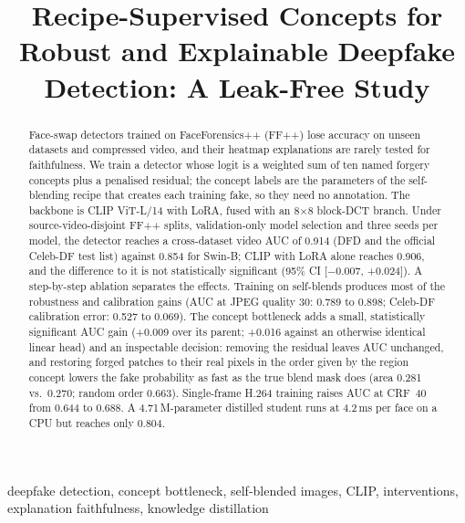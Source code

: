 \documentclass[conference]{IEEEtran}
\begin{document}
\title{Recipe-Supervised Concepts for Robust and Explainable Deepfake Detection: A Leak-Free Study}

\author{
}

\maketitle

\begin{abstract}
Face-swap detectors trained on FaceForensics++ (FF++) lose accuracy on unseen datasets and compressed video, and
their heatmap explanations are rarely tested for faithfulness. We train a detector whose logit is a weighted sum of
ten named forgery concepts plus a penalised residual; the concept labels are the parameters of the self-blending
recipe that creates each training fake, so they need no annotation. The backbone is CLIP ViT-L/14 with LoRA, fused
with an 8$\times$8 block-DCT branch. Under source-video-disjoint FF++ splits, validation-only model
selection and three seeds per model, the detector reaches a cross-dataset video AUC of 0.914 (DFD and the official
Celeb-DF test list) against 0.854 for Swin-B; CLIP with LoRA alone reaches 0.906, and the difference to it is not
statistically significant (95\% CI [$-$0.007, +0.024]). A step-by-step ablation separates the effects. Training on
self-blends produces most of the robustness and calibration gains (AUC at JPEG quality 30: 0.789 to 0.898;
Celeb-DF calibration error: 0.527 to 0.069). The concept bottleneck adds a small, statistically significant AUC gain
(+0.009 over its parent; +0.016 against an otherwise identical linear head) and an inspectable decision: removing
the residual leaves AUC unchanged, and restoring forged patches to their real pixels in the order given by the region
concept lowers the fake probability as fast as the true blend mask does (area 0.281 vs.\ 0.270; random order
0.663). Single-frame H.264 training raises AUC at CRF~40 from 0.644 to 0.688. A 4.71\,M-parameter distilled
student runs at 4.2\,ms per face on a CPU but reaches only 0.804.
\end{abstract}

\begin{IEEEkeywords}
deepfake detection, concept bottleneck, self-blended images, CLIP, interventions, explanation faithfulness,
knowledge distillation
\end{IEEEkeywords}
\end{document}
